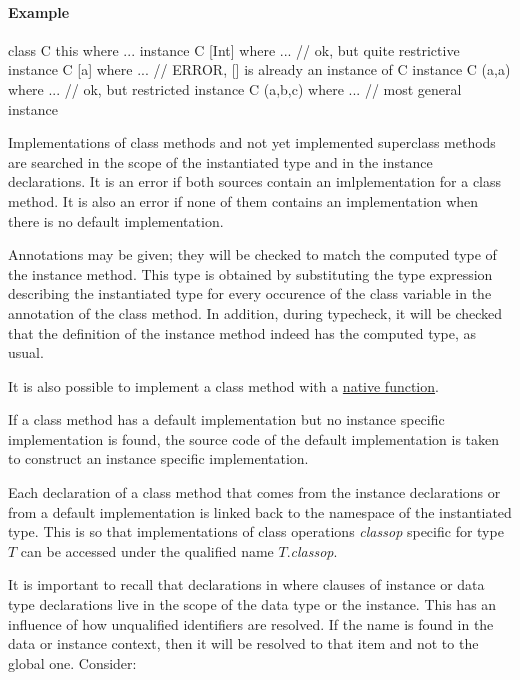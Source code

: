 \paragraph*{Example}
\begin{code}
    class C this where ...
    instance C [Int] where ...   // ok, but quite restrictive
    instance C [a]   where ...   // ERROR, [] is already an instance of C
    instance C (a,a) where ...   // ok, but restricted
    instance C (a,b,c) where ... // most general instance
\end{code}

Implementations of class methods and not yet implemented superclass methods are searched in the scope of the instantiated type and in the instance declarations.
It is an error if both sources contain an imlplementation for a class method. It is also an error if none of them contains an implementation when there is no default implementation.

Annotations may be given; they will be checked to match the computed type of the instance method.
This type is obtained by substituting the type expression describing the instantiated type for every occurence of the class variable in the annotation of the class method. In addition, during typecheck, it will be checked that the definition of the instance method indeed has the computed type, as usual.

It is also possible to implement a class method with a \hyperref[nativefun]{native function}.

If a class method has a default implementation but no instance specific implementation is found, the source code of the default implementation is taken to construct an instance specific implementation.

Each declaration of a class method that comes from the instance declarations or from a default implementation is linked back to the namespace of the instantiated type. This is so that implementations of class operations \emph{classop} specific for type $T$ can be accessed under the qualified name $T$.\emph{classop}.

It is important to recall that declarations in where clauses of instance or data type declarations live in the scope of the data type or the instance. This has an influence of how unqualified identifiers are resolved. If the name is found in the data or instance context, then it will be resolved to that item and not to the global one. Consider:

